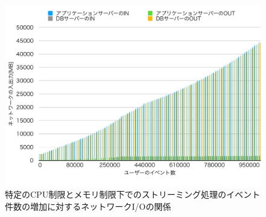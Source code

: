 \documentclass[../../../../../../main]{subfiles}
\begin{document}
    \begin{figure}[H]
        \centering
        \includegraphics[width=12cm]{graph}
        \caption{特定のCPU制限とメモリ制限下でのストリーミング処理のイベント件数の増加に対するネットワークI/Oの関係}
        \label{fig:stream-netio-app_1_1024-db_1_1024}
    \end{figure}
\end{document}
